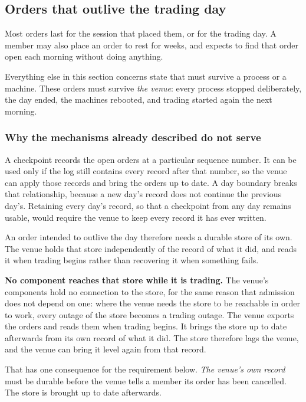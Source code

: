 \subsection{Orders that outlive the trading day}
\label{sec:ha:disabled:long_lived}

Most orders last for the session that placed them, or for the trading day. A
member may also place an order to rest for weeks, and expects to find that order
open each morning without doing anything.

Everything else in this section concerns state that must survive a process or a
machine. These orders must survive \emph{the venue}: every process stopped
deliberately, the day ended, the machines rebooted, and trading started again the
next morning.

\subsubsection{Why the mechanisms already described do not serve}
\label{sec:ha:disabled:long_lived:why}

A checkpoint records the open orders at a particular sequence number. It can
be used only if the log still contains every record after that number, so the
venue can apply those records and bring the orders up to date. A day boundary
breaks that relationship, because a new day's record does not continue the
previous day's. Retaining every day's record, so that a checkpoint from any day
remains usable, would require the venue to keep every record it has ever
written.

An order intended to outlive the day therefore needs a durable store of its own.
The venue holds that store independently of the record of what it did, and reads
it when trading begins rather than recovering it when something fails.

\textbf{No component reaches that store while it is trading.} The venue's
components hold no connection to the store, for the same reason that admission
does not depend on one: where the venue needs the store to be reachable in order
to work, every outage of the store becomes a trading outage. The venue exports
the orders and reads them when trading begins. It brings the store up to date
afterwards from its own record of what it did. The store therefore lags the
venue, and the venue can bring it level again from that record.

That has one consequence for the requirement below. \emph{The venue's own
record} must be durable before the venue tells a member its order has been
cancelled. The store is brought up to date afterwards.

